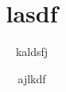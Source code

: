 \documentclass[a4paper,12pt]{book}
\begin{document}
\title{lasdf}
\author{kaldsfj}
\date{ajlkdf}
\maketitle
\blindtext[1]
\end{document}
